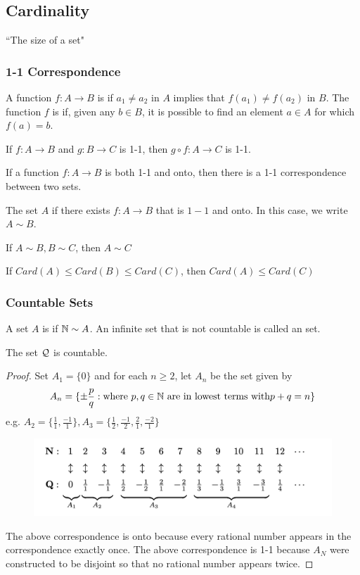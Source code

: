 \documentclass[11pt]{article}
\begin{document}
\subsection{Cardinality}
``The size of a set"
\subsubsection{1-1 Correspondence}
 A function $f: A \rightarrow B$ is  if $a_1 \neq a_2$ in $A$ implies that $f(a_1) \neq f(a_2)$ in $B$. The function $f$ is  if, given any $b \in B$, it is possible to find an element $a \in A$ for which $f(a) = b$.

\proposition
If $f: A \rightarrow B$ and $g: B \rightarrow C$ is 1-1, then $g \circ f: A \rightarrow C$ is 1-1.


\remark
If a function $f: A \rightarrow B$ is both 1-1 and onto, then there is a 1-1 correspondence between two sets.

 The set $A$  if there exists $f: A \rightarrow B$ that is $1-1$ and onto. In this case, we write $A \sim B$.

\proposition
If $A \sim B, B \sim C$, then $A \sim C$

\proposition
If $Card(A) \leq Card(B) \leq Card(C)$, then $Card(A) \leq Card(C)$

\subsubsection{Countable Sets} 
A set $A$ is  if $\mathbb{N} \sim A$. An infinite set that is not countable is called an  set.

\theorem
The set $\mathcal{Q}$ is countable.

\begin{proof}
	Set $A_1 = \{0\}$ and for each $n \geq 2$, let $A_n$ be the set given by
	$$A_n = \{ \pm \frac{p}{q}: \text{where }p,q \in \mathbb{N} \text{ are in lowest terms with} p + q = n \}$$ 
	e.g. $A_2 = \{ \frac{1}{1}, \frac{-1}{1}\}, A_3 = \{\frac{1}{2}, \frac{-1}{2}, \frac{2}{1}, \frac{-2}{1}\}$
	
\begin{figure}[H]
	\centering
	\includegraphics[scale=0.6]{p1.png}
\end{figure}
\noindent The above correspondence is onto because every rational number appears in the correspondence exactly once. The above correspondence is 1-1 because $A_N$ were constructed to be disjoint so that no rational number appears twice.
\end{proof}
\end{document}
